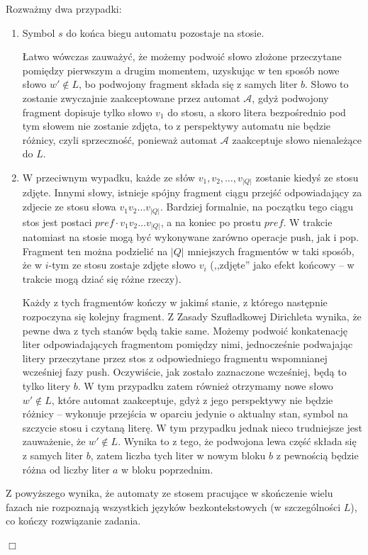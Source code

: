 \documentclass[12pt]{article}
\begin{document}
	\medskip
	
	Rozważmy dwa przypadki:
	\begin{enumerate}
		\item Symbol \(s\) do końca biegu automatu pozostaje na stosie.
		      
		      Łatwo wówczas zauważyć, że możemy podwoić słowo złożone
		      przeczytane pomiędzy pierwszym a drugim momentem, uzyskując w ten
		      sposób nowe słowo \(w' \notin L\), bo podwojony fragment składa
		      się z samych liter \(b\). Słowo to zostanie zwyczajnie
		      zaakceptowane przez automat \(\mathcal{A}\), gdyż podwojony
		      fragment dopisuje tylko słowo \(v_{1}\) do stosu, a skoro litera
		      bezpośrednio pod tym słowem nie zostanie zdjęta, to z perspektywy
		      automatu nie będzie różnicy, czyli sprzeczność, ponieważ automat
		      \(\mathcal{A}\) zaakceptuje słowo nienależące do \(L\).
		
		\item W przeciwnym wypadku, każde ze słów \(v_{1}, v_{2}, \ldots,
		      v_{\left| Q \right|}\) zostanie kiedyś ze stosu zdjęte. Innymi
		      słowy, istnieje spójny fragment ciągu przejść odpowiadający za
		      zdjecie ze stosu słowa \(v_{1} v_{2} \ldots v_{\left| Q
		      \right|}\). Bardziej formalnie, na początku tego ciągu stos jest
		      postaci \(pref \cdot v_{1} v_{2} \ldots v_{\left| Q \right|}\), a
		      na koniec po prostu \(pref\). W trakcie natomiast na stosie mogą
		      być wykonywane zarówno operacje push, jak i pop. Fragment ten
		      można podzielić na \(\left| Q \right|\) mniejszych fragmentów w
		      taki sposób, że w \(i\)-tym ze stosu zostaje zdjęte słowo
		      \(v_{i}\) (,,zdjęte'' jako efekt końcowy -- w trakcie mogą dziać
		      się różne rzeczy).
		      
		      \medskip
		      
		      Każdy z tych fragmentów kończy w jakimś stanie, z którego
		      następnie rozpoczyna się kolejny fragment. Z Zasady Szufladkowej
		      Dirichleta wynika, że pewne dwa z tych stanów będą takie same.
		      Możemy podwoić konkatenację liter odpowiadających fragmentom
		      pomiędzy nimi, jednocześnie podwajając litery przeczytane przez
		      stos z odpowiedniego fragmentu wspomnianej wcześniej fazy push.
		      Oczywiście, jak zostało zaznaczone wcześniej, będą to tylko litery
		      \(b\). W tym przypadku zatem również otrzymamy nowe słowo \(w'
		      \notin L\), które automat zaakceptuje, gdyż z jego perspektywy
		      nie będzie różnicy -- wykonuje przejścia w oparciu jedynie o
		      aktualny stan, symbol na szczycie stosu i czytaną literę. W tym
		      przypadku jednak nieco trudniejsze jest zauważenie, że \(w' \notin
		      L\). Wynika to z tego, że podwojona lewa część składa się z samych
		      liter \(b\), zatem liczba tych liter w nowym bloku \(b\) z
		      pewnością będzie różna od liczby liter \(a\) w bloku poprzednim.
	\end{enumerate}
	
	\medskip
	
	Z powyższego wynika, że automaty ze stosem pracujące w skończenie wielu
	fazach nie rozpoznają wszystkich języków bezkontekstowych (w szczególności
	\(L\)), co kończy rozwiązanie zadania.
	\begin{flushright}
		\(\Box\)
	\end{flushright}
\end{document}
